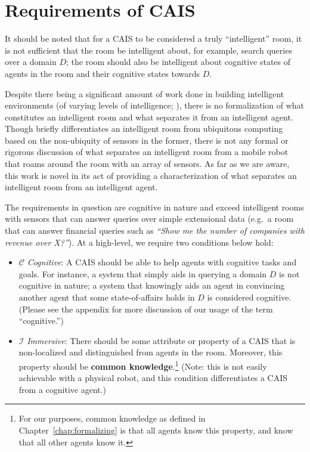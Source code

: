 \section{Requirements of CAIS}\label{ref:requirements_cais}

It should be noted that for a CAIS to be considered a truly
``intelligent'' room, it is not sufficient that the room be
intelligent about, for example, search queries over a domain $D$; the
room should also be intelligent about cognitive states of agents in
the room and their cognitive states towards $D$.

Despite there being a significant amount of work done in building
intelligent environments (of varying levels of intelligence;
\cite{coen_design_1998,brooks_intelligent_1997,chan_review_2008}),
there is no formalization of what constitutes an intelligent room and
what separates it from an intelligent agent.  Though
\cite{coen_design_1998} briefly differentiates an intelligent room
from ubiquitous computing based on the non-ubiquity of sensors in the
former, there is not any formal or rigorous discussion of what
separates an intelligent room from a mobile robot that roams around
the room with an array of sensors. As far as we are aware, this work
is novel in its act of providing a characterization of what separates
an intelligent room from an intelligent agent.

The requirements in question are cognitive in nature and exceed
intelligent rooms with sensors that can answer queries over simple
extensional data (e.g.\ a room that can answer financial queries such
as \textit{``Show me the number of companies with revenue over X?''}).
At a high-level, we require two conditions below hold:

\begin{itemize}
    \item $\mathcal{C}$ \emph{Cognitive}: A CAIS should be able to
      help agents with cognitive tasks and goals.  For instance, a
      system that simply aids in querying a domain $D$ is not
      cognitive in nature; a system that knowingly aids an agent in convincing
      another agent that some state-of-affairs holds in $D$ is
      considered cognitive. (Please see the appendix for more
      discussion of our usage of the term ``cognitive.'')
    \item $\mathcal{I}$ \emph{Immersive}: There should be some
      attribute or property of a CAIS that is non-localized and
      distinguished from agents in the room.  Moreover, this property
      should be \textbf{common knowledge}.\footnote{For our purposes,
        common knowledge as defined in Chapter~\ref{chap:formalizing}
        is that all agents know this property, and know that all other
        agents know it.}  (Note: this is not easily achievable with a
      physical robot, and this condition differentiates a CAIS from a
      cognitive agent.)
\end{itemize}

